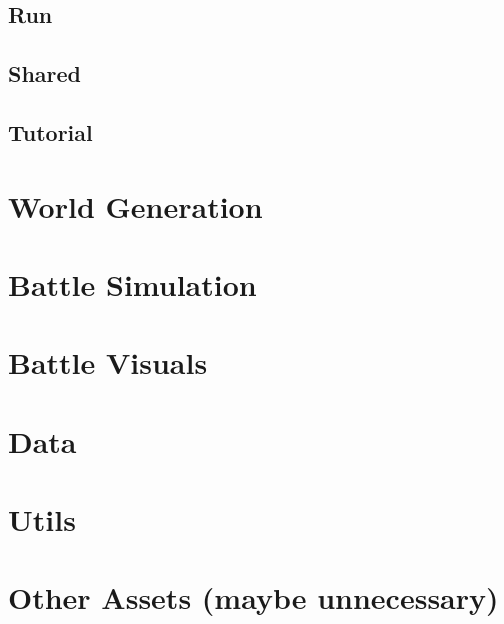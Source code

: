 \subsection{Run}

\subsection{Shared}

\subsection{Tutorial}

\section{World Generation}\label{sec:docs-worldgen}

\section{Battle Simulation}\label{sec:docs-sim}

\section{Battle Visuals}\label{sec:docs-vis}

\section{Data}\label{sec:docs-data}

\section{Utils}\label{sec:docs-utils}

\section{Other Assets (maybe unnecessary)}
